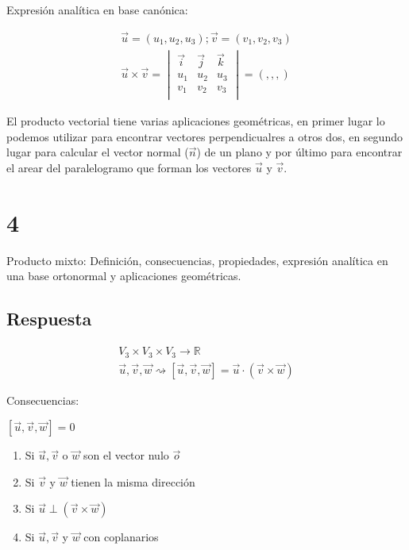 \documentclass[
	12pt, %
	spanish, %
]{fphw}
\newcommand{\vu}{\vec{u}}
\newcommand{\vv}{\vec{v}}
\newcommand{\vw}{\vec{w}}
\begin{document}
Expresión analítica en base canónica:

\begin{gather*}
	\vec{u}=(u_1,u_2,u_3);\vec{v} =(v_1,v_2,v_3)\\
	\vec{u} \times \vec{v} = 
	\begin{vmatrix}
		\vec{i} & \vec{j} & \vec{k} \\
		u_1 & u_2 & u_3\\
		v_1 & v_2 & v_3 \\
	\end{vmatrix} = ( , , ,)
\end{gather*}

El producto vectorial tiene varias aplicaciones geométricas, en primer lugar lo podemos utilizar para encontrar vectores perpendicualres a otros dos, en segundo lugar para calcular el vector normal ($\vec{n}$) de un plano y por último para encontrar el arear del paralelogramo que forman los vectores $\vec{u}$ y $\vec{v}$.



\section*{4}

\begin{problem}
	
Producto mixto: Definición, consecuencias, propiedades, expresión analítica en
una base ortonormal y aplicaciones geométricas.
\end{problem}

\subsection*{Respuesta}

\begin{gather*}
	V_3 \times V_3 \times V_3 \rightarrow \mathbb{R}\\
	\vec{u},\vec{v},\vec{w} \rightsquigarrow [\vec{u},\vec{v},\vec{w}] =  \vec{u} \cdot (\vec{v} \times \vec{w})
\end{gather*}


Consecuencias:

$[\vu,\vv,\vw] = 0$

\begin{enumerate}
	\item Si $\vu, \vv$ o $\vw$ son el vector nulo $\vec{o}$
	\item Si $\vv$ y $\vw$ tienen la misma dirección
	\item Si $\vu \perp (\vv \times \vw)$
	\item Si $\vu, \vv$ y $\vw$ con coplanarios
\end{enumerate}
\end{document}
